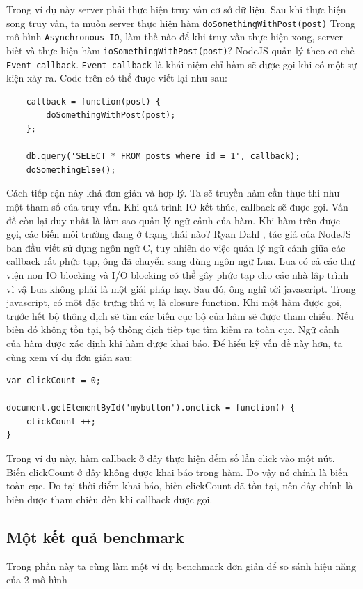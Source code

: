 	Trong ví dụ này server phải thực hiện truy vấn cơ sở dữ liệu. Sau khi thực hiện song truy vấn, ta muốn server thực hiện hàm \texttt{doSomethingWithPost(post)} Trong mô hình \texttt{Asynchronous IO}, làm thế nào để khi truy vấn thực hiện xong, server biết và thực hiện hàm \texttt{ioSomethingWithPost(post)}? NodeJS quản lý theo cơ chế \texttt{Event callback}. \texttt{Event callback} là khái niệm chỉ hàm sẽ được gọi khi có một sự kiện xảy ra.
	Code trên có thể được viết lại như sau:
\begin{verbatim}
	callback = function(post) {
		doSomethingWithPost(post);
	};

	db.query('SELECT * FROM posts where id = 1', callback);
	doSomethingElse();
\end{verbatim}
	Cách tiếp cận này khá đơn giản và hợp lý. Ta sẽ truyền hàm cần thực thi như một tham số của truy vấn. Khi quá trình IO kết thúc, callback sẽ được gọi.
	Vấn đề còn lại duy nhất là làm sao quản lý ngữ cảnh của hàm. Khi hàm trên được gọi, các biến môi trường đang ở trạng thái nào? Ryan Dahl , tác giả của NodeJS ban đầu viết sử dụng ngôn ngữ C, tuy nhiên do việc quản lý ngữ cảnh giữa các callback rất phức tạp, ông đã chuyển sang dùng ngôn ngữ Lua. Lua có cả các thư viện non IO blocking và I/O blocking có thể gây phức tạp cho các nhà lập trình vì vậ Lua không phải là một giải pháp hay. Sau đó, ông nghĩ tới javascript. Trong javascript, có một đặc trưng thú vị là closure function. Khi một hàm được gọi, trước hết bộ thông dịch sẽ tìm các biến cục bộ của hàm sẽ được tham chiếu. Nếu biến đó không tồn tại, bộ thông dịch tiếp tục tìm kiếm ra toàn cục. Ngữ cảnh của hàm được xác định khi hàm được khai báo. Để hiểu kỹ vấn đề này hơn, ta cùng xem ví dụ đơn giản sau:

\begin{verbatim}
var clickCount = 0;
	
document.getElementById('mybutton').onclick = function() {
	clickCount ++;
}
\end{verbatim}
	Trong ví dụ này, hàm callback ở đây thực hiện đếm số lần click vào một nút. Biến clickCount ở đây không được khai báo trong hàm. Do vậy nó chính là biến toàn cục. Do tại thời điểm khai báo, biến clickCount đã tồn tại, nên đây chính là biến được tham chiếu đến khi callback được gọi.
	
\subsection{Một kết quả benchmark}
Trong phần này ta cùng làm một ví dụ benchmark đơn giản để so sánh hiệu năng của 2 mô hình \\
